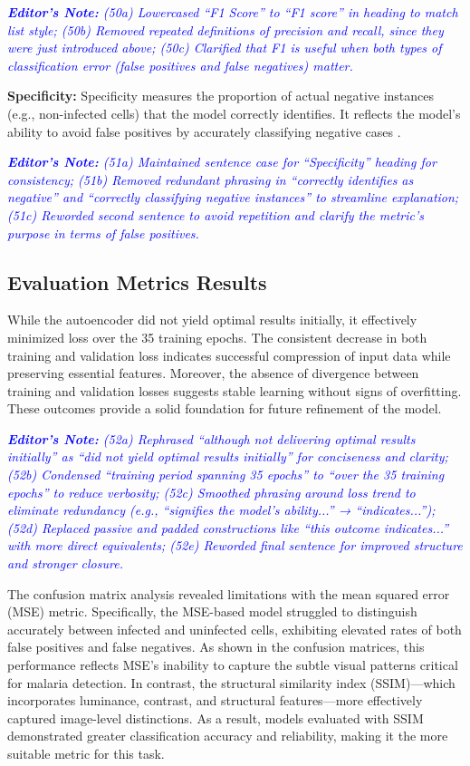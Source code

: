 \documentclass[journal,12pt,onecolumn,draftcls]{IEEEtran}
\newcommand{\editornote}[1]{\par\textit{\textcolor{blue}{\textbf{Editor's Note:} #1}}\par}
\begin{document}
\editornote{(50a) Lowercased “F1 Score” to “F1 score” in heading to match list style;
(50b) Removed repeated definitions of precision and recall, since they were just introduced above;
(50c) Clarified that F1 is useful when both types of classification error (false positives and false negatives) matter.}

\textbf{Specificity:} Specificity measures the proportion of actual negative instances (e.g., non-infected cells) that the model correctly identifies. It reflects the model’s ability to avoid false positives by accurately classifying negative cases \cite{powers2011}.

\editornote{(51a) Maintained sentence case for “Specificity” heading for consistency; 
(51b) Removed redundant phrasing in “correctly identifies as negative” and “correctly classifying negative instances” to streamline explanation;
(51c) Reworded second sentence to avoid repetition and clarify the metric’s purpose in terms of false positives.}

\subsection{Evaluation Metrics Results}
While the autoencoder did not yield optimal results initially, it effectively minimized loss over the 35 training epochs. The consistent decrease in both training and validation loss indicates successful compression of input data while preserving essential features. Moreover, the absence of divergence between training and validation losses suggests stable learning without signs of overfitting. These outcomes provide a solid foundation for future refinement of the model.

\editornote{(52a) Rephrased “although not delivering optimal results initially” as “did not yield optimal results initially” for conciseness and clarity;
(52b) Condensed “training period spanning 35 epochs” to “over the 35 training epochs” to reduce verbosity;
(52c) Smoothed phrasing around loss trend to eliminate redundancy (e.g., “signifies the model’s ability...” → “indicates...”);
(52d) Replaced passive and padded constructions like “this outcome indicates...” with more direct equivalents;
(52e) Reworded final sentence for improved structure and stronger closure.}

The confusion matrix analysis revealed limitations with the mean squared error (MSE) metric. Specifically, the MSE-based model struggled to distinguish accurately between infected and uninfected cells, exhibiting elevated rates of both false positives and false negatives. As shown in the confusion matrices, this performance reflects MSE’s inability to capture the subtle visual patterns critical for malaria detection. In contrast, the structural similarity index (SSIM)—which incorporates luminance, contrast, and structural features—more effectively captured image-level distinctions. As a result, models evaluated with SSIM demonstrated greater classification accuracy and reliability, making it the more suitable metric for this task.
\end{document}
